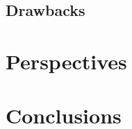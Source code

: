 \documentclass[compress,red]{beamer}
\begin{document}
\subsection{Drawbacks}



\section{Perspectives}


\section{Conclusions}

\end{document}
